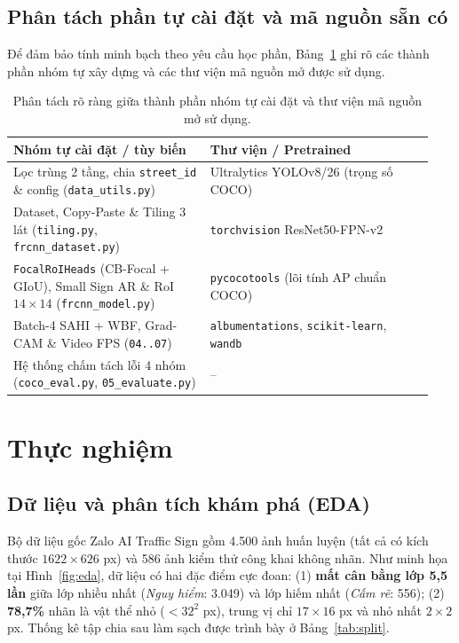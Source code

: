 \documentclass[11pt]{article}
\begin{document}
\subsection{Phân tách phần tự cài đặt và mã nguồn sẵn có}
Để đảm bảo tính minh bạch theo yêu cầu học phần, Bảng~\ref{tab:transparency} ghi rõ các thành phần nhóm tự xây dựng và các thư viện mã nguồn mở được sử dụng.

\begin{table}[t]
\centering
\small
\begin{tabular}{@{}p{0.44\linewidth}p{0.50\linewidth}@{}}
\toprule
\textbf{Nhóm tự cài đặt / tùy biến} & \textbf{Thư viện / Pretrained} \\
\midrule
Lọc trùng 2 tầng, chia \texttt{street\_id} \& config (\texttt{data\_utils.py}) & Ultralytics YOLOv8/26 (trọng số COCO) \\
Dataset, Copy-Paste \& Tiling 3 lát (\texttt{tiling.py}, \texttt{frcnn\_dataset.py}) & \texttt{torchvision} ResNet50-FPN-v2 \\
\texttt{FocalRoIHeads} (CB-Focal + GIoU), Small Sign AR \& RoI $14\times 14$ (\texttt{frcnn\_model.py}) & \texttt{pycocotools} (lõi tính AP chuẩn COCO) \\
Batch-4 SAHI + WBF, Grad-CAM \& Video FPS (\texttt{04..07}) & \texttt{albumentations}, \texttt{scikit-learn}, \texttt{wandb} \\
Hệ thống chấm tách lỗi 4 nhóm (\texttt{coco\_eval.py}, \texttt{05\_evaluate.py}) & -- \\
\bottomrule
\end{tabular}
\caption{Phân tách rõ ràng giữa thành phần nhóm tự cài đặt và thư viện mã nguồn mở sử dụng.}
\label{tab:transparency}
\end{table}

\section{Thực nghiệm}
\label{sec:experiments}

\subsection{Dữ liệu và phân tích khám phá (EDA)}
Bộ dữ liệu gốc Zalo AI Traffic Sign \citep{zalo2020traffic} gồm 4.500 ảnh huấn luyện (tất cả có kích thước $1622\times 626$ px) và 586 ảnh kiểm thử công khai không nhãn. Như minh họa tại Hình~\ref{fig:eda}, dữ liệu có hai đặc điểm cực đoan: (1) \textbf{mất cân bằng lớp 5,5 lần} giữa lớp nhiều nhất (\textit{Nguy hiểm}: 3.049) và lớp hiếm nhất (\textit{Cấm rẽ}: 556); (2) \textbf{78,7\%} nhãn là vật thể nhỏ ($<32^2$ px), trung vị chỉ $17\times 16$ px và nhỏ nhất $2\times 2$ px. Thống kê tập chia sau làm sạch được trình bày ở Bảng~\ref{tab:split}.
\end{document}
